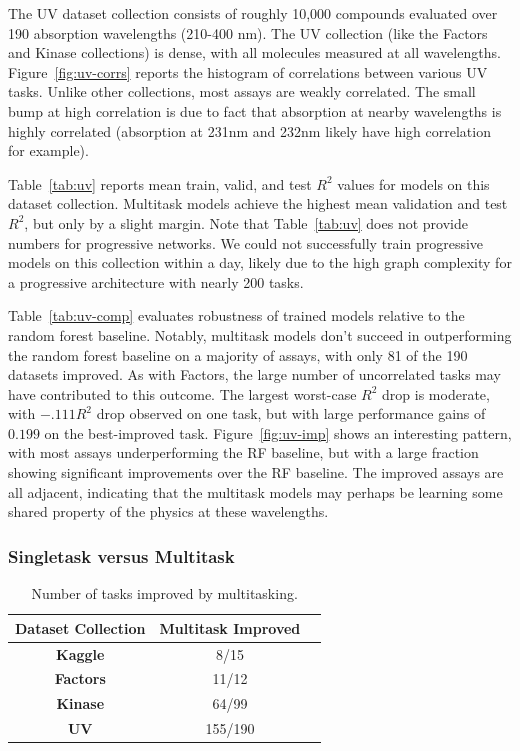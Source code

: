 The UV dataset collection consists of roughly 10,000 compounds evaluated over 190 absorption wavelengths (210-400 nm). The UV collection (like the Factors and Kinase collections) is dense, with all molecules measured at all wavelengths. Figure~\ref{fig:uv-corrs} reports the histogram of correlations between various UV tasks. Unlike other collections, most assays are weakly correlated. The small bump at high correlation is due to fact that absorption at nearby wavelengths is highly correlated (absorption at 231nm and 232nm likely have high correlation for example).


Table~\ref{tab:uv} reports mean train, valid, and test $R^2$ values for models on this dataset collection. Multitask models achieve the highest mean validation and test $R^2$, but only by a slight margin. Note that Table~\ref{tab:uv} does not provide numbers for progressive networks. We could not successfully train progressive models on this collection within a day, likely due to the high graph complexity for a progressive architecture with nearly 200 tasks.

Table~\ref{tab:uv-comp} evaluates robustness of trained models relative to the random forest baseline. Notably, multitask models don't succeed in outperforming the random forest baseline on a majority of assays, with only 81 of the
190 datasets improved. As with Factors, the large number of uncorrelated tasks may have contributed to this outcome. The largest worst-case $R^2$ drop is moderate, with $-.111 R^2$ drop observed on one task, but with large performance gains of $0.199$ on the best-improved task. Figure~\ref{fig:uv-imp} shows an interesting pattern, with most assays underperforming the RF baseline, but with a large fraction showing significant improvements over the RF baseline. The improved assays are all adjacent, indicating that the multitask models may perhaps be learning some shared property of the physics at these wavelengths.


\subsubsection{Singletask versus Multitask}
\begin{table}[h]
    \centering
    \begin{tabular}{ |c|c|c| } 
    \hline
     Dataset Collection & Multitask Improved \\ 
    \hline
    \textbf{Kaggle} & 8/15  \\
    \hline
    \textbf{Factors} & 11/12  \\
    \hline
    \textbf{Kinase} & 64/99  \\
    \hline
    \textbf{UV} & 155/190 \\
    \hline
    \end{tabular}
    \caption{Number of tasks improved by multitasking.}
    \label{tab:tasks-improved}
\end{table}

